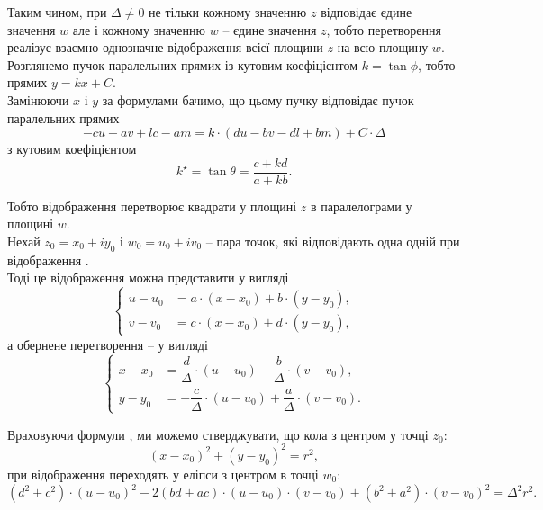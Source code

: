 Таким чином, при $\Delta \ne 0$ не тільки кожному значенню $z$ відповідає єдине значення $w$ але і кожному значенню $w$ -- єдине значення $z$, тобто перетворення  реалізує взаємно-однозначне відображення всієї площини $z$ на всю площину $w$. \\

Розглянемо пучок паралельних прямих із кутовим коефіцієнтом $k = \tan \phi$, тобто прямих $y = k x + C$. \\

Замінюючи $x$ і $y$ за формулами  бачимо, що цьому пучку відповідає пучок паралельних прямих 
\begin{equation*}
    -c u + a v + l c - a m = k \cdot (d u - b v - d l + b m) + C \cdot \Delta
\end{equation*} 
з кутовим коефіцієнтом 
\begin{equation*}
    k^\star = \tan \theta = \dfrac{c + k d}{a + k b}.    
\end{equation*}

Тобто відображення  перетворює квадрати у площині $z$ в паралелограми у площині $w$. \\

Нехай $z_0 = x_0 + i y_0$ і $w_0 = u_0 + i v_0$ -- пара точок, які відповідають одна одній при відображення . \\

Тоді це відображення можна представити у вигляді
\begin{equation}
    \label{eq:27.7}
    \left\{
        \begin{aligned}
            u - u_0 &= a \cdot (x - x_0) + b \cdot (y - y_0), \\
            v - v_0 &= c \cdot (x - x_0) + d \cdot (y - y_0), 
        \end{aligned}
    \right.
\end{equation}
а обернене перетворення -- у вигляді
\begin{equation}
    \label{eq:27.8}
    \left\{
        \begin{aligned}
            x - x_0 &= \dfrac d \Delta \cdot (u - u_0) - \dfrac b \Delta \cdot (v - v_0), \\
            y - y_0 &= - \dfrac c \Delta \cdot (u - u_0) + \dfrac a \Delta \cdot (v - v_0).
        \end{aligned}
    \right.
\end{equation}

Враховуючи формули , ми можемо стверджувати, що кола з центром у точці $z_0$:
\begin{equation*}
    (x - x_0)^2 + (y - y_0)^2 = r^2,
\end{equation*}
при відображення  переходять у еліпси з центром в точці $w_0$:
\begin{equation}
    \label{eq:27.9}
    (d^2 + c^2) \cdot (u - u_0)^2 - 2 (b d + a c) \cdot (u - u_0) \cdot (v - v_0) + (b^2 + a^2) \cdot (v - v_0)^2 = \Delta^2 r^2.
\end{equation}

